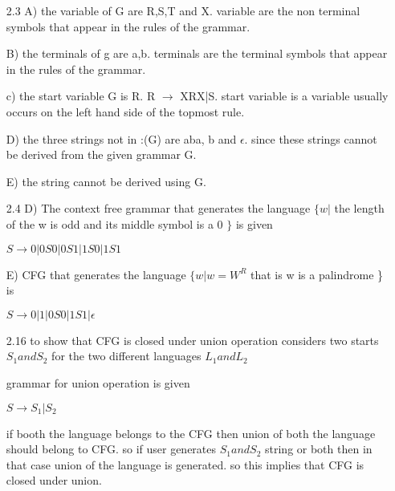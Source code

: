 \documentclass[11pt]{article}
\theoremstyle{thmstyle}
\begin{document}

\thispagestyle{firstpage} %

\setlength{\abovedisplayskip}{20pt} %
\setlength{\belowdisplayskip}{20pt} %





\begin{itemize}\setlength{\itemsep}{1em} %
\item[2.3] A) the variable of G are R,S,T and X. variable are the non terminal symbols that appear in the rules of the grammar.

B) the terminals of g are a,b. terminals are the terminal symbols that appear in the rules of the grammar.

c) the start variable G is R. R $\longrightarrow$ XRX|S. start variable is a variable usually occurs on the left hand side of the topmost rule.

D) the three strings not in :(G) are aba, b and $\epsilon$. since these strings cannot be derived from the given grammar G.

E) the string cannot be derived using G.

\item[2.4] D) The context free grammar that generates the language $\{ w|$ the length of the w is odd and its middle symbol is a 0  $ \}$ is given

$S \longrightarrow 0|0S0|0S1|1S0|1S1$

E) CFG that generates the language $\{ w|w = W^R $ that is w is a palindrome \} is 

$S \longrightarrow 0|1|0S0|1S1|\epsilon$


\item[2.16] to show that CFG is closed under union operation considers two starts $S_1 and S_2$
 for the two different languages $L_1 and L_2$
 
 grammar for union operation is given 
 
 $ S \longrightarrow S_1 | S_2$
 
 if booth the language belongs to the CFG then union of both the language should belong to CFG. so if user generates $S_1 and S_2$ string or both then in that case union of the language is generated. so this implies that CFG is closed under union.
 

\end{itemize}
\end{document}
